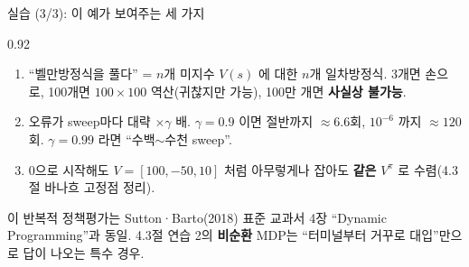 \begin{frame}{실습 (3/3): 이 예가 보여주는 세 가지}
\begin{center}\begin{varwidth}{0.92\textwidth}
  \begin{enumerate}
    \item {} ``벨만방정식을 풀다'' =
      $n$개 미지수 $V(s)$ 에 대한 $n$개 일차방정식. 3개면
      손으로, 100개면 $100 \times 100$ 역산(귀찮지만 가능),
      100만 개면 \textbf{사실상 불가능}.
    \item {} 오류가 sweep마다 대략
      $\times \gamma$ 배. $\gamma = 0.9$ 이면 절반까지
      $\approx 6.6$회, $10^{-6}$ 까지 $\approx 120$회.
      $\gamma = 0.99$ 라면 ``수백$\sim$수천 sweep''.
    \item {} 0으로 시작해도
      $V = [100, -50, 10]$ 처럼 아무렇게나 잡아도 \textbf{같은}
      $V^\pi$ 로 수렴(4.3절 바나흐 고정점 정리).
  \end{enumerate}
  {\footnotesize 이 반복적 정책평가는 Sutton·Barto(2018) 표준
  교과서 4장 ``Dynamic Programming''과 동일. 4.3절 연습 2의
  \textbf{비순환} MDP는 ``터미널부터 거꾸로 대입''만으로 답이
  나오는 특수 경우.}
\end{varwidth}\end{center}
\end{frame}
